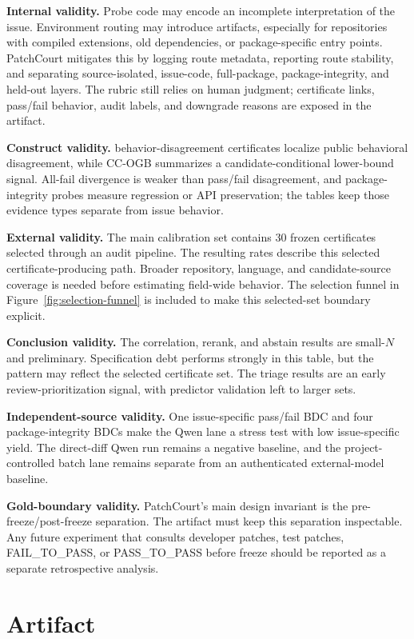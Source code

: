\documentclass[conference]{IEEEtran}
\newcommand{\patchcourt}{PatchCourt\xspace}
\newcommand{\bdcs}{behavior-disagreement certificates\xspace}
\newcommand{\ccogb}{CC-OGB\xspace}
\begin{document}
\textbf{Internal validity.}
Probe code may encode an incomplete interpretation of the issue.
Environment routing may introduce artifacts, especially for repositories with compiled extensions, old dependencies, or package-specific entry points.
\patchcourt mitigates this by logging route metadata, reporting route stability, and separating source-isolated, issue-code, full-package, package-integrity, and held-out layers.
The rubric still relies on human judgment; certificate links, pass/fail behavior, audit labels, and downgrade reasons are exposed in the artifact.

\textbf{Construct validity.}
\bdcs localize public behavioral disagreement, while \ccogb summarizes a candidate-conditional lower-bound signal.
All-fail divergence is weaker than pass/fail disagreement, and package-integrity probes measure regression or API preservation; the tables keep those evidence types separate from issue behavior.

\textbf{External validity.}
The main calibration set contains 30 frozen certificates selected through an audit pipeline.
The resulting rates describe this selected certificate-producing path.
Broader repository, language, and candidate-source coverage is needed before estimating field-wide behavior.
The selection funnel in Figure~\ref{fig:selection-funnel} is included to make this selected-set boundary explicit.

\textbf{Conclusion validity.}
The correlation, rerank, and abstain results are small-$N$ and preliminary.
Specification debt performs strongly in this table, but the pattern may reflect the selected certificate set.
The triage results are an early review-prioritization signal, with predictor validation left to larger sets.

\textbf{Independent-source validity.}
One issue-specific pass/fail BDC and four package-integrity BDCs make the Qwen lane a stress test with low issue-specific yield.
The direct-diff Qwen run remains a negative baseline, and the project-controlled batch lane remains separate from an authenticated external-model baseline.

\textbf{Gold-boundary validity.}
\patchcourt's main design invariant is the pre-freeze/post-freeze separation.
The artifact must keep this separation inspectable.
Any future experiment that consults developer patches, test patches, FAIL\_TO\_PASS, or PASS\_TO\_PASS before freeze should be reported as a separate retrospective analysis.

\section{Artifact}
\end{document}
